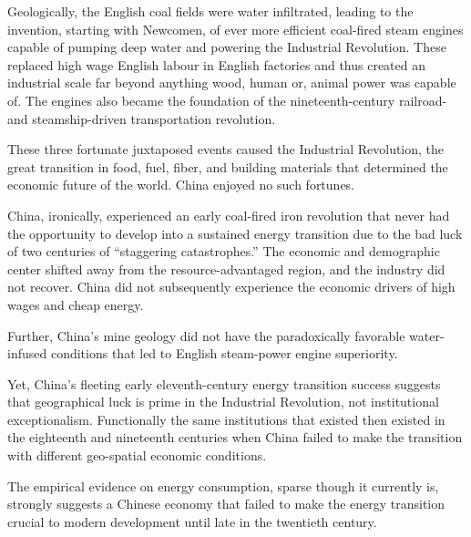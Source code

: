\documentclass[12pt]{article}
\numberwithin{equation}{section}
\begin{document}
	Geologically, the English coal fields were water infiltrated, leading to the invention, starting with Newcomen, of ever more efficient coal-fired steam engines capable of pumping deep water and powering the Industrial Revolution. These replaced high wage English labour in English factories and thus created an industrial scale far beyond anything wood, human or, animal power was capable of. The engines also became the foundation of the nineteenth-century railroad- and steamship-driven transportation revolution.
	
	These three fortunate juxtaposed events caused the Industrial Revolution, the great transition in food, fuel, fiber, and building materials that determined the economic future of the world. China enjoyed no such fortunes.
	
	China, ironically, experienced an early coal-fired iron revolution that never had the opportunity to develop into a sustained energy transition due to the bad luck of two centuries of ``staggering catastrophes.'' The economic and demographic center shifted away from the resource-advantaged region, and the industry did not recover. China did not subsequently experience the economic drivers of high wages and cheap energy.
	
	Further, China's mine geology did not have the paradoxically favorable water-infused conditions that led to English steam-power engine superiority.
	
	Yet, China's fleeting early eleventh-century energy transition success suggests that geographical luck is prime in the Industrial Revolution, not institutional exceptionalism. Functionally the same institutions that existed then existed in the eighteenth and nineteenth centuries when China failed to make the transition with different geo-spatial economic conditions.
	
	The empirical evidence on energy consumption, sparse though it currently is, strongly suggests a Chinese economy that failed to make the energy transition crucial to modern development until late in the twentieth century.
\end{document}
